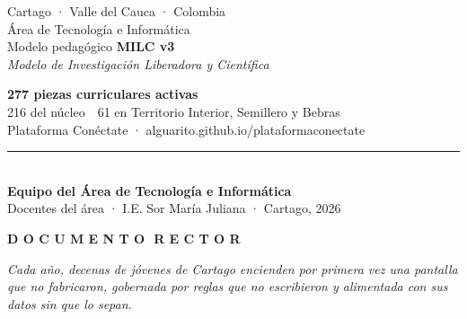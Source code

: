 \documentclass[12pt, a4paper]{article}
\begin{document}
\begin{titlepage}
\begin{tcolorbox}
{\normalsize\color{white}Cartago · Valle del Cauca · Colombia}\\[0.22cm]
{\small\color{white!70!vinoInst}Área de Tecnología e Informática}\\[1.0cm]
{\normalsize\color{white}Modelo pedagógico \textbf{MILC v3}}\\[0.12cm]
{\small\itshape\color{white!72!vinoInst}Modelo de Investigación Liberadora y Científica}
\vfill
\begin{tcolorbox}[
  colback=white!10!vinoInst,
  colframe=dorado!55!vinoInst,
  boxrule=1pt,
  arc=10pt,
  width=0.84\linewidth,
  halign=center,
  top=10pt, bottom=10pt
]
\centering
{\color{dorado!88!white}\textbf{277 piezas curriculares activas}}\\[0.3cm]
{\small\color{white}216 del núcleo \,\textperiodcentered\, 61 en Territorio Interior, Semillero y Bebras}\\[0.16cm]
{\footnotesize\color{white!72!vinoInst}Plataforma Conéctate · alguarito.github.io/plataformaconectate}
\end{tcolorbox}

\vspace{0.7cm}
{\color{white!30!vinoInst}\rule{0.46\linewidth}{0.4pt}}\\[0.5cm]
{\normalsize\color{white}\textbf{Equipo del Área de Tecnología e Informática}}\\[0.15cm]
{\small\color{white!72!vinoInst}Docentes del área · I.E. Sor María Juliana · Cartago, 2026}
\end{tcolorbox}
\restoregeometry
\end{titlepage}
\nopagecolor

\newpage
\thispagestyle{empty}
\vspace*{0.4cm}

\noindent{\color{dorado}\rule{3cm}{3pt}}\hfill
{\footnotesize\color{vinoInst!55!white}\textbf{D O C U M E N T O\, \,R E C T O R}}

\vspace{0.7cm}

\vfill

\noindent\begin{minipage}{0.95\linewidth}\raggedright
{\fontsize{17}{26}\selectfont\itshape\color{vinoInst!88!black}Cada año, decenas de
jóvenes de Cartago encienden por primera vez una pantalla que no fabricaron,
gobernada por reglas que no escribieron y alimentada con sus datos sin que lo
sepan.}
\end{minipage}
\end{document}
